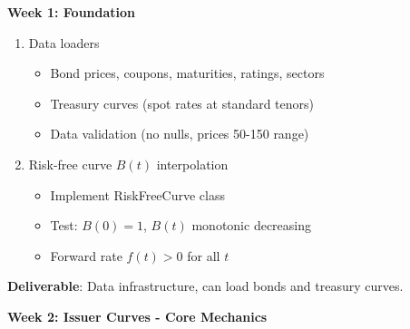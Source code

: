 \documentclass[11pt,a4paper]{article}
\begin{document}
\textbf{Week 1: Foundation}

\begin{enumerate}
    \item Data loaders
    \begin{itemize}
        \item Bond prices, coupons, maturities, ratings, sectors
        \item Treasury curves (spot rates at standard tenors)
        \item Data validation (no nulls, prices 50-150 range)
    \end{itemize}
    
    \item Risk-free curve $B(t)$ interpolation
    \begin{itemize}
        \item Implement RiskFreeCurve class
        \item Test: $B(0) = 1$, $B(t)$ monotonic decreasing
        \item Forward rate $f(t) > 0$ for all $t$
    \end{itemize}
\end{enumerate}

\textbf{Deliverable}: Data infrastructure, can load bonds and treasury curves.

\vspace{0.5cm}

\textbf{Week 2: Issuer Curves - Core Mechanics}
\end{document}
